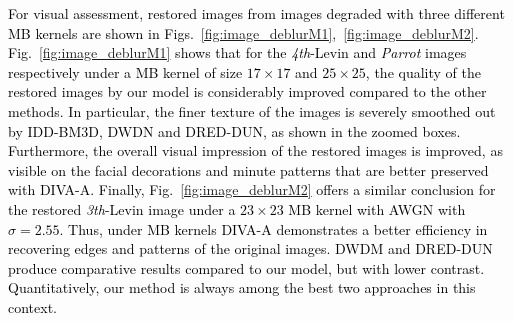 \documentclass[10pt,journal,compsoc]{IEEEtran}
\newcommand{\sd}{\textcolor{black}}
\newcommand{\dk}{\textcolor{black}}
\begin{document}
\sd{For visual assessment, restored images from images degraded with three different MB kernels are shown in Figs.~\ref{fig:image_deblurM1},~\ref{fig:image_deblurM2}. Fig.~\ref{fig:image_deblurM1} shows that for the \textit{4th}-Levin and \textit{Parrot} images respectively under a MB kernel of size $17 \times 17$ and $25 \times 25$, the quality of the restored images by our model is considerably improved compared to the other methods.
In particular, the finer texture of the images is severely smoothed out by IDD-BM3D, DWDN and DRED-DUN, as shown in the zoomed boxes. 
Furthermore, the overall visual impression of the restored images is improved, as visible on the facial decorations and minute patterns that are better preserved with \dk{DIVA}-A. Finally, Fig.~\ref{fig:image_deblurM2} offers a similar conclusion for the restored \textit{3th}-Levin image under a $23 \times 23$ MB kernel with AWGN with $\sigma=2.55$.
Thus, under MB kernels \dk{DIVA}-A demonstrates a better efficiency in recovering edges and patterns of the original images. DWDM and DRED-DUN produce comparative results compared to our model, but with lower contrast. Quantitatively, our method is always among the best two approaches in this context.}
\end{document}
